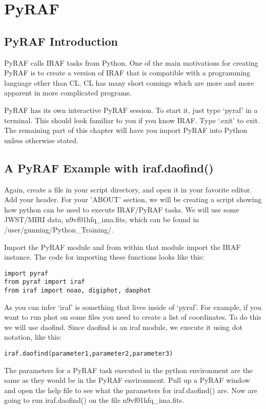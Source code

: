 \chapter{PyRAF}
\label{ch:pyraf}
 
\section{PyRAF Introduction}

PyRAF calls IRAF tasks from Python.  One of the main motivations for
creating PyRAF is to create a version of IRAF that is compatible with
a programming language other than CL. CL has many short comings which
are more and more apparent in more complicated programs.

PyRAF has its own interactive PyRAF session.  To start it, just type
`pyraf' in a terminal.  This should look familiar to you if you know
IRAF.  Type `.exit' to exit.  The remaining part of this chapter will
have you import PyRAF into Python unless otherwise stated.

\section{A PyRAF Example with {\sf iraf.daofind()}}

Again, create a file in your script directory, and open it in your
favorite editor.  Add your header.  For your 'ABOUT' section, we will
be creating a script showing how python can be used to execute
IRAF/PyRAF tasks. We will use some JWST/MIRI data, n9vf01hfq\_ima.fits,
which can be found in /user/gunning/Python\_Training/.

Import the PyRAF module and from within that module import the IRAF
instance.  The code for importing these functions looks like this:

\begin{verbatim}
import pyraf 
from pyraf import iraf
from iraf import noao, digiphot, daophot
\end{verbatim}

As you can infer `iraf' is something that lives inside of `pyraf'.
For example, if you want to run {\sf\small phot} on some files you
need to create a list of coordinates.  To do this we will use
{\sf\small daofind}.  Since {\sf\small daofind} is an iraf module, we
execute it using dot notation, like this:

\texttt{iraf.daofind(parameter1,parameter2,parameter3)}

The parameters for a PyRAF task executed in the python environment are
the same as they would be in the PyRAF environment. Pull up a PyRAF
window and open the help file to see what the parameters for
{\sf\small iraf.daofind()} are. Now are going to run {\sf\small
  iraf.daofind()} on the file n9vf01hfq\_ima.fits.  

